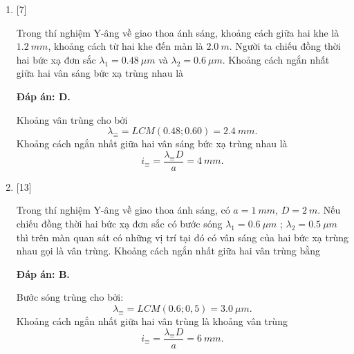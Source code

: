 \begin{enumerate}[label=\bfseries Câu \arabic*:]
	
	\item {} [7]
	\cauhoi
	{Trong thí nghiệm Y-âng về giao thoa ánh sáng, khoảng cách giữa hai khe là $\SI{1,2}{mm}$, khoảng cách từ hai khe đến màn là $\SI{2,0}{m}$. Người ta chiếu đồng thời hai bức xạ đơn sắc $\lambda_{1} = \SI{0,48}{\mu m}$ và $\lambda_{2} = \SI{0,6}{\mu m}$. Khoảng cách ngắn nhất giữa hai vân sáng bức xạ trùng nhau là
	}
	
	\loigiai
	{		\textbf{Đáp án: D.}
		
		Khoảng vân trùng cho bởi
		$$
		\lambda_{\equiv} = LCM(\num{0,48};\num{0,60}) = \SI{2,4}{mm}.
		$$
		Khoảng cách ngắn nhất giữa hai vân sáng bức xạ trùng nhau là
		$$
		i_{\equiv} = \dfrac{\lambda_{\equiv} D}{a} = \SI{4}{mm}.
		$$
	}
	
	\item {} [13]
	\cauhoi
	{Trong thí nghiệm Y-âng về giao thoa ánh sáng, có $a = \SI{1}{mm}$, $D = \SI{2}{m}$. Nếu chiếu đồng thời hai bức xạ đơn sắc có bước sóng $\lambda_{1}=\SI{0,6}{\mu m}$ ; $\lambda_{2} =\SI{0,5}{\mu m}$ thì trên màn quan sát có những vị trí tại đó có vân sáng của hai bức xạ trùng nhau gọi là vân trùng. Khoảng cách ngắn nhất giữa hai vân trùng bằng
	}
	
	\loigiai
	{		\textbf{Đáp án: B.}
		
		Bước sóng trùng cho bởi:
		$$
		\lambda_{\equiv} = LCM(\num{0,6};{0,5}) = \SI{3,0}{\mu m}.
		$$
		Khoảng cách ngắn nhất giữa hai vân trùng là khoảng vân trùng
		$$
		i_{\equiv} = \dfrac{\lambda_{\equiv }D}{a} = \SI{6}{mm}.
		$$
	}
	

\end{enumerate}
